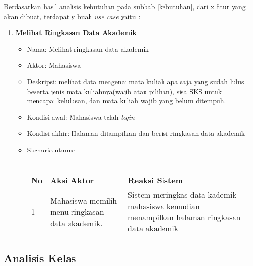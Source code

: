 Berdasarkan hasil analisis kebutuhan pada subbab \ref{kebutuhan}, dari x fitur yang akan dibuat, terdapat y buah \textit{use case} yaitu :
\begin{enumerate}
    \item \textbf{Melihat Ringkasan Data Akademik}
		\begin{itemize}
			\item Nama: Melihat ringkasan data akademik
			\item Aktor: Mahasiswa
			\item Deskripsi: melihat data mengenai mata kuliah apa saja yang sudah lulus beserta jenis mata kuliahnya(wajib atau pilihan), sisa SKS untuk mencapai kelulusan, dan mata kuliah wajib yang belum ditempuh. 
			\item Kondisi awal: Mahasiswa telah \textit{login}
			\item Kondisi akhir: Halaman ditampilkan dan berisi ringkasan data akademik
			\item Skenario utama: \\ \\
			\begin{tabular}{|p{0.5cm} |p{6cm}| p{6cm}|}
						\hline
							No 	& Aksi Aktor & Reaksi Sistem \\ \hline
							1 	& Mahasiswa memilih menu ringkasan data akademik. 	&	Sistem meringkas data kademik mahasiswa kemudian menampilkan halaman ringkasan data akademik \\ \hline 
						\end{tabular} 
		\end{itemize}
\end{enumerate}



\subsection{Analisis Kelas}





